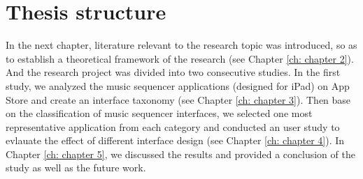 \section{Thesis structure}

In the next chapter, literature relevant to the research topic was introduced, so as to establish a theoretical framework of the research (see Chapter \ref{ch: chapter 2}). And the research project was divided into two consecutive studies. In the first study, we analyzed the music sequencer applications (designed for iPad) on App Store and create an interface taxonomy (see Chapter \ref{ch: chapter 3}). Then base on the classification of music sequencer interfaces, we selected one most representative application from each category and conducted an user study to evlauate the effect of different interface design (see Chapter \ref{ch: chapter 4}). In Chapter \ref{ch: chapter 5}, we discussed the results and provided a conclusion of the study as well as the future work.
